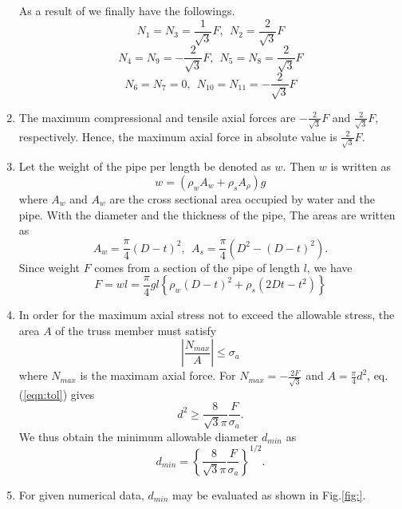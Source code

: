 \documentclass[10pt,a4j]{article}
\begin{document}
\begin{enumerate}
	As a result of we finally have the followings. 
	\[
		N_1=N_3=\frac{1}{\sqrt{3}}F ,\ \ N_2=\frac{2}{\sqrt{3}}F
	\]
	\[
		N_4=N_9=-\frac{2}{\sqrt{3}}F ,\ \ N_5=N_8=\frac{2}{\sqrt{3}}F
	\]
	\[
		N_6=N_7=0, \ \ N_{10}=N_{11}=-\frac{2}{\sqrt{3}}F
	\]
\item
	The maximum compressional and tensile axial forces are $-\frac{2}{\sqrt{3}}F$ 
	and $\frac{2}{\sqrt{3}}F$, respectively.
	Hence, the maximum axial force in absolute value is $\frac{2}{\sqrt{3}}F$.
\item
	Let the weight of the pipe per length be denoted as $w$. Then $w$ is written as 
	\begin{equation}
		w= \left( \rho_w A_w + \rho_s A_\rho \right)g
		\label{eqn:}
	\end{equation}
	where $A_w$ and $A_w$ are the cross sectional area occupied by 
	water and the pipe.
	With the diameter and the thickness of the pipe, The areas are written as 
	\begin{equation}
		A_w=\frac{\pi}{4}(D-t)^2, \ \ A_s=\frac{\pi}{4}\left(D^2-(D-t)^2\right).
		\label{eqn:}
	\end{equation}
	Since weight $F$ comes from a section of the pipe of length $l$, we have
	\begin{equation}
		F=wl=
		\frac{\pi}{4}gl
		\left\{ 
			\rho_w(D-t)^2+ \rho_s\left(2Dt-t^2\right)
		\right\}
		\label{eqn:F_explicit}
	\end{equation}
\item
	In order for the maximum axial stress not to exceed the allowable stress, the area 
	$A$ of the truss member must satisfy 
	\begin{equation}
		\left| \frac{N_{max}}{A}\right| \leq \sigma_a
		\label{eqn:tol}
	\end{equation}
	where $N_{max}$ is the maximam axial force.
	For $N_{max}=-\frac{2F}{\sqrt{3}}$ and $A=\frac{\pi}{4}d^2$, eq.(\ref{eqn:tol}) gives
	\begin{equation}
		d^2 \geq  \frac{8}{\sqrt{3}\pi} \frac{F}{\sigma_a}.
		\label{eqn:}
	\end{equation}
	We thus obtain the minimum allowable diameter $d_{min}$ as 
	\begin{equation}
		d_{min}=
		\left\{ \frac{8}{\sqrt{3}\pi} \frac{F}{\sigma_a}
		\right\}^{1/2}.
		\label{eqn:dmin}
	\end{equation}
\item
	For given numerical data, $d_{min}$ may be evaluated as shown in Fig.\ref{fig:}.
\end{enumerate}
\end{document}

